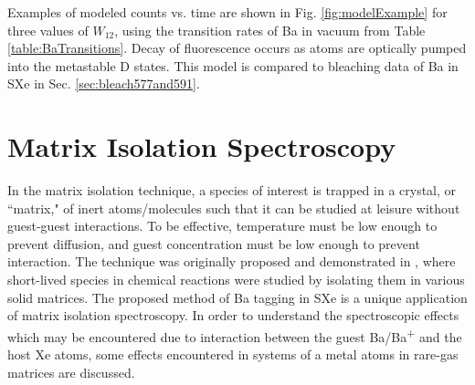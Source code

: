 Examples of modeled counts vs. time are shown in Fig. \ref{fig:modelExample} for three values of $W_{12}$, using the transition rates of Ba in vacuum from Table \ref{table:BaTransitions}.  Decay of fluorescence occurs as atoms are optically pumped into the metastable D states.  This model is compared to bleaching data of Ba in SXe in Sec. \ref{sec:bleach577and591}.


\section{Matrix Isolation Spectroscopy}
\label{sec:matrix}


In the matrix isolation technique, a species of interest is trapped in a crystal, or ``matrix," of inert atoms/molecules such that it can be studied at leisure without guest-guest interactions.  To be effective, temperature must be low enough to prevent diffusion, and guest concentration must be low enough to prevent interaction.  The technique was originally proposed and demonstrated in \cite{matrixIso}, where short-lived species in chemical reactions were studied by isolating them in various solid matrices.  The proposed method of Ba tagging in SXe is a unique application of matrix isolation spectroscopy.  In order to understand the spectroscopic effects which may be encountered due to interaction between the guest Ba/Ba\textsuperscript{+} and the host Xe atoms, some effects encountered in systems of a metal atoms in rare-gas matrices are discussed.

